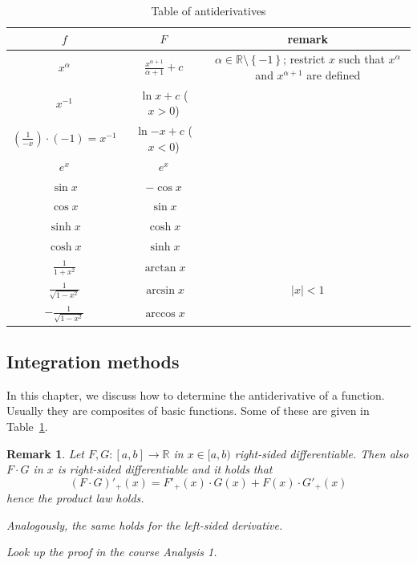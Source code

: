 \documentclass{article}
\newtheorem{remark}{Remark}  \numberwithin{remark}{section}
\newcommand{\set}[1]{\left\{#1\right\}}
\newcommand{\card}[1]{\left|#1\right|}
\begin{document}
\begin{table}[!h]
  \begin{center}
    \begin{tabular}{c|c|c}
      $f$ & $F$ & remark \\
    \hline
      $x^\alpha$ & $\frac{x^{\alpha+1}}{\alpha + 1} + c$ & $\alpha \in \mathbb R \setminus \set{-1}$; restrict $x$ such that $x^\alpha$ and $x^{\alpha+1}$ are defined \\
      $x^{-1}$ & $\ln{x} + c$ ($x > 0$) & \\
      $\left(\frac1{-x}\right) \cdot (-1) = x^{-1}$ & $\ln{-x} + c$ ($x < 0$) & \\
      $e^x$ & $e^x$ & \\
      $\sin{x}$ & $-\cos{x}$ & \\
      $\cos{x}$ & $\sin{x}$ & \\
      $\sinh{x}$ & $\cosh{x}$ & \\
      $\cosh{x}$ & $\sinh{x}$ & \\
      $\frac{1}{1 + x^2}$ & $\arctan x$ \\
      $\frac{1}{\sqrt{1 - x^2}}$ & $\arcsin{x}$ & $\card{x} < 1$ \\
      $-\frac{1}{\sqrt{1 - x^2}}$ & $\arccos{x}$ &
    \end{tabular}
  \end{center}
  \caption{Table of antiderivatives}
  \label{tbl:antideriv}
\end{table}

\subsection{Integration methods}

In this chapter, we discuss how to determine the antiderivative of a function.
Usually they are composites of basic functions. Some of these are given in Table~\ref{tbl:antideriv}.

\begin{remark}
  Let $F, G: [a,b] \to \mathbb R$ in $x \in [a,b)$ right-sided differentiable.
  Then also $F \cdot G$ in $x$ is right-sided differentiable and it holds that
  \[ (F \cdot G)'_+(x) = F'_+(x) \cdot G(x) + F(x) \cdot G'_+(x) \]
  hence the product law holds.

  Analogously, the same holds for the left-sided derivative.

  Look up the proof in the course Analysis 1.
\end{remark}
\end{document}
